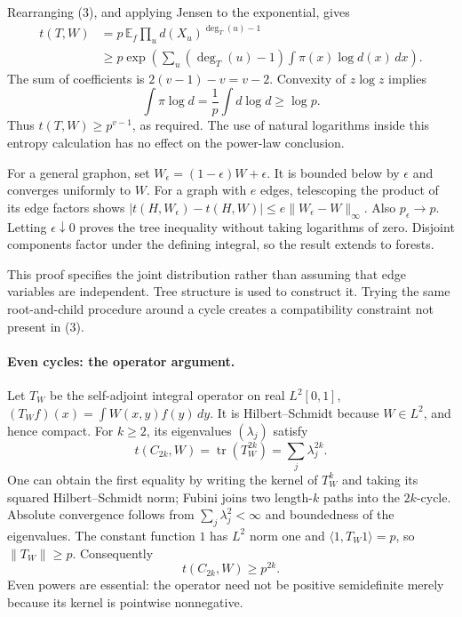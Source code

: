 \documentclass[11pt]{article}
\begin{document}
Rearranging (3), and applying Jensen to the exponential, gives
\[
 \begin{split}
 t(T,W)
 &=p\,\mathbb E_f\prod_ud(X_u)^{\deg_T(u)-1}\\
 &\ge p\exp\left(\sum_u(\deg_T(u)-1)
                      \int\pi(x)\log d(x)\,dx\right).
 \end{split}                                             \tag{4}
\]
The sum of coefficients is $2(v-1)-v=v-2$.
Convexity of $z\log z$ implies
\[
       \int\pi\log d=\frac1p\int d\log d\ge\log p.
\]
Thus $t(T,W)\ge p^{v-1}$, as required.
The use of natural logarithms inside this entropy calculation has
no effect on the power-law conclusion.

For a general graphon, set $W_\epsilon=(1-\epsilon)W+\epsilon$.
It is bounded below by $\epsilon$ and converges uniformly to $W$.
For a graph with $e$ edges, telescoping the product of its edge factors
shows $|t(H,W_\epsilon)-t(H,W)|\le e\|W_\epsilon-W\|_\infty$.
Also $p_\epsilon\to p$. Letting $\epsilon\downarrow0$ proves the tree
inequality without taking logarithms of zero. Disjoint components
factor under the defining integral, so the result extends to forests.

This proof specifies the joint distribution rather than assuming that
edge variables are independent. Tree structure is used to construct it.
Trying the same root-and-child procedure around a cycle creates a
compatibility constraint not present in (3).

\paragraph{Even cycles: the operator argument.}
Let $T_W$ be the self-adjoint integral operator on real $L^2[0,1]$,
$(T_Wf)(x)=\int W(x,y)f(y)\,dy$. It is Hilbert--Schmidt because
$W\in L^2$, and hence compact. For $k\ge2$, its eigenvalues
$(\lambda_j)$ satisfy
\[
               t(C_{2k},W)=\operatorname{tr}(T_W^{2k})
                            =\sum_j\lambda_j^{2k}.       \tag{5}
\]
One can obtain the first equality by writing the kernel of $T_W^k$
and taking its squared Hilbert--Schmidt norm; Fubini joins two length-$k$
paths into the $2k$-cycle. Absolute convergence follows from
$\sum_j\lambda_j^2<\infty$ and boundedness of the eigenvalues.
The constant function $1$ has $L^2$ norm one and
$\langle1,T_W1\rangle=p$, so $\|T_W\|\ge p$.
Consequently
\[
                           t(C_{2k},W)\ge p^{2k}.         \tag{6}
\]
Even powers are essential: the operator need not be positive semidefinite
merely because its kernel is pointwise nonnegative.
\end{document}
